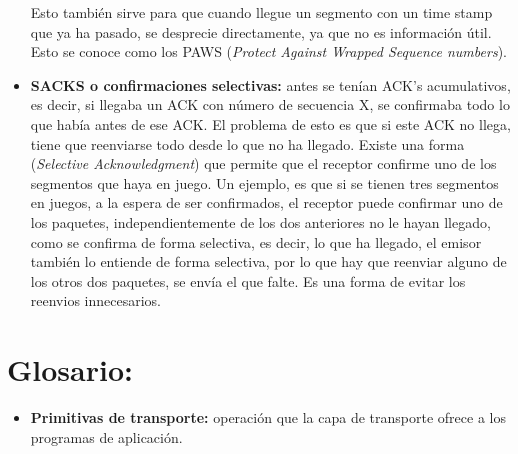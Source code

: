 \documentclass[a4paper,11pt]{article}
\begin{document}
\begin{itemize}
Esto también sirve para que cuando llegue un segmento con un time stamp que ya ha pasado, se desprecie directamente, ya que no es información útil. Esto se conoce como los PAWS (\textit{Protect Against Wrapped Sequence numbers}). 

\item \textbf{SACKS o confirmaciones selectivas:} antes se tenían ACK's acumulativos, es decir, si llegaba un ACK con número de secuencia X, se confirmaba todo lo que había antes de ese ACK. El problema de esto es que si este ACK no llega, tiene que reenviarse todo desde lo que no ha llegado. Existe una forma (\textit{Selective Acknowledgment}) que permite que el receptor confirme uno de los segmentos que haya en juego. Un ejemplo, es que si se tienen tres segmentos en juegos, a la espera de ser confirmados, el receptor puede confirmar uno de los paquetes, independientemente de los dos anteriores no le hayan llegado, como se confirma de forma selectiva, es decir, lo que ha llegado, el emisor también lo entiende de forma selectiva, por lo que hay que reenviar alguno de los otros dos paquetes, se envía el que falte. Es una forma de evitar los reenvios innecesarios.
\end{itemize}



\section{Glosario:}
\begin{itemize}
\item \textbf{Primitivas de transporte:} operación que la capa de transporte ofrece a los programas de aplicación.
\end{itemize}
\end{document}
